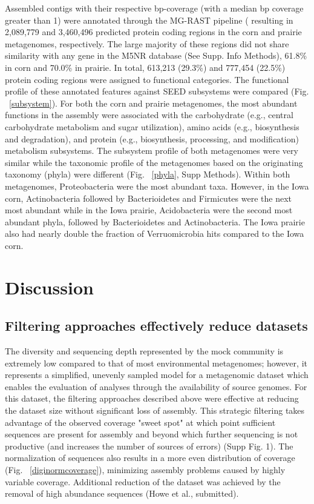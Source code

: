 \documentclass[11pt]{article} %
\begin{document}
Assembled contigs with their respective bp-coverage (with a median bp
coverage greater than 1) were annotated through the MG-RAST pipeline (
resulting in 2,089,779 and 3,460,496 predicted protein coding regions
in the corn and prairie metagenomes, respectively.  The large majority
of these regions did not share similarity with any gene in the M5NR 
database (See Supp. Info Methods), 61.8\% in corn and 70.0\% in prairie.  In total, 613,213 (29.3\%) and
777,454 (22.5\%) protein coding regions were assigned to functional categories.
The functional profile of these annotated features against SEED
subsystems were compared (Fig. ~\ref{subsystem}).  For both the corn
and prairie metagenomes, the most abundant functions in the assembly were associated
with the carbohydrate (e.g., central carbohydrate metabolism and sugar
utilization), amino acids (e.g., biosynthesis and degradation), and
protein (e.g., biosynthesis, processing, and modification)
metabolism subsystems.  The subsystem profile of both metagenomes were very
similar while the taxonomic profile of the metagenomes based on the
originating taxonomy (phyla) were different (Fig. ~\ref{phyla}, Supp
Methods).  Within both metagenomes, Proteobacteria were the most
abundant taxa.  However, in the Iowa corn, Actinobacteria followed by
Bacterioidetes and Firmicutes were the next most abundant while in the
Iowa prairie, Acidobacteria were the second most abundant phyla,
followed by Bacterioidetes and Actinobacteria.  The Iowa prairie also
had nearly double the fraction of Verruomicrobia hits compared to the Iowa
corn.


\section{Discussion}

\subsection{Filtering approaches effectively reduce datasets} 

The diversity and sequencing depth represented by the mock community
is extremely low compared to that of most environmental metagenomes;
however, it represents a simplified, unevenly sampled model for a
metagenomic dataset which enables the evaluation of analyses through
the availability of source genomes.  For this dataset, the filtering
approaches described above were effective at reducing the dataset size
without significant loss of assembly.  This strategic filtering takes
advantage of the observed coverage "sweet spot" at which point
sufficient sequences are present for assembly and beyond which further
sequencing is not productive (and increases the number of sources of
errors) (Supp Fig. 1).  The normalization of sequences also results in
a more even distribution of coverage (Fig. ~\ref{diginormcoverage}),
minimizing assembly problems caused by highly variable coverage.
Additional reduction of the dataset was achieved by the removal of
high abundance sequences (Howe et al., submitted).
\end{document}
